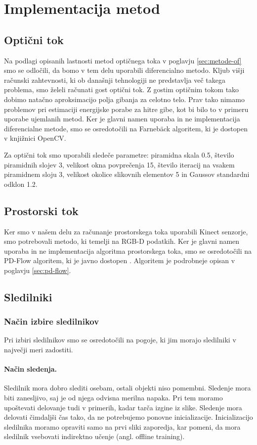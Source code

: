 \section{Implementacija metod}
\subsection{Optični tok}
Na podlagi opisanih lastnosti metod optičnega toka v poglavju \ref{sec:metode-of} smo se odločili, da bomo v tem delu uporabili diferencialno metodo. Kljub višji računski zahtevnosti, ki ob današnji tehnologiji ne predstavlja več takega problema, smo želeli računati gost optični tok. Z gostim optičnim tokom tako dobimo natačno aproksimacijo polja gibanja za celotno telo. Prav tako nimamo problemov pri estimaciji energijske porabe za hitre gibe, kot bi bilo to v primeru uporabe ujemlanih metod. Ker je glavni namen uporaba in ne implementacija diferencialne metode, smo se osredotočili na Farneb{\"a}ck algoritem, ki je dostopen v knjižnici OpenCV.

Za optični tok smo uporabili sledeče parametre: piramidna skala \num{0.5}, število piramidnih slojev \num{3}, velikost okna povprečenja \num{15}, število iteracij na vsakem piramidnem sloju \num{3}, velikost okolice slikovnih elementov \num{5} in Gaussov standardni odklon \num{1.2}.

\subsection{Prostorski tok}
Ker smo v našem delu za računanje prostorskega toka uporabili Kinect senzorje, smo potrebovali metodo, ki temelji na RGB-D podatkih. Ker je glavni namen uporaba in ne implementacija algoritma prostorskega toka, smo se osredotočili na PD-Flow algoritem, ki je javno dostopen \cite{jaimez2015primal}. Algoritem je podrobneje opisan v poglavju \ref{sec:pd-flow}.

\subsection{Sledilniki}
\subsubsection{Način izbire sledilnikov}\label{sec:pogoji-sledilnikov}
Pri izbiri sledilnikov smo se osredotočili na pogoje, ki jim morajo sledilniki v največji meri zadostiti.

\paragraph{Način sledenja.} Sledilnik mora dobro slediti osebam, ostali objekti niso pomembni. Sledenje mora biti zanesljivo, saj je od njega odvisna merilna napaka. Pri tem moramo upoštevati delovanje tudi v primerih, kadar tarča izgine iz slike. Sledenje mora delovati čimdaljši čas tako, da ne potrebujemo ponovne inicializacije. Inicializacijo sledilnika moramo opraviti samo na prvi sliki zaporedja, kar pomeni, da mora sledilnik vsebovati indirektno učenje (angl. offline training).

